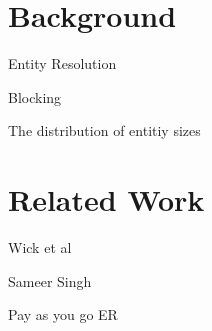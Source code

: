 
\section{Background}

Entity Resolution

Blocking

The distribution of entitiy sizes


\section{Related Work}

Wick et al

Sameer Singh

Pay as you go ER

